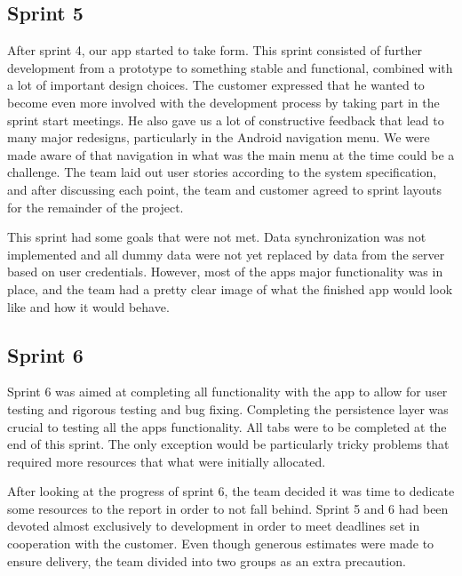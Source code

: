 \subsection{Sprint 5}
After sprint 4, our app started to take form. This sprint consisted of further development from a prototype to something stable and functional, combined with a lot of important design choices. The customer expressed that he wanted to become even more involved with the development process by taking part in the sprint start meetings.
He also gave us a lot of constructive feedback that lead to many major redesigns, particularly in the Android navigation menu. We were made aware of that navigation in what was the main menu at the time could be a challenge. The team laid out user stories according to the system specification, and after discussing each point, the team and customer agreed to sprint layouts for the remainder of the project.

This sprint had some goals that were not met. Data synchronization was not implemented and all dummy data were not yet replaced by data from the server based on user credentials. However, most of the apps major functionality was in place, and the team had a pretty clear image of what the finished app would look like and how it would behave.

\subsection{Sprint 6}
Sprint 6 was aimed at completing all functionality with the app to allow for user testing and rigorous testing and bug fixing. Completing the persistence layer was crucial to testing all the apps functionality. All tabs were to be completed at the end of this sprint. The only exception would be particularly tricky problems that required more resources that what were initially allocated.

After looking at the progress of sprint 6, the team decided it was time to dedicate some resources to the report in order to not fall behind. Sprint 5 and 6 had been devoted almost exclusively to development in order to meet deadlines set in cooperation with the customer. Even though generous estimates were made to ensure delivery, the team divided into two groups as an extra precaution. 

